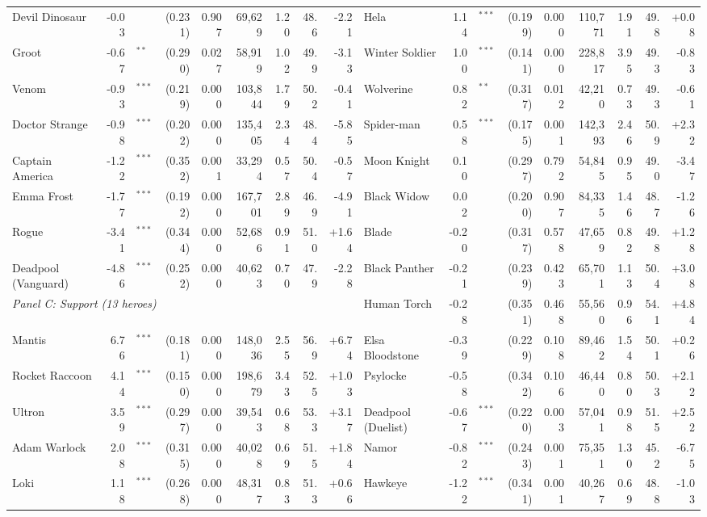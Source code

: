 \documentclass[11pt]{article}
\begin{document}
\begin{landscape}
\begin{center}
{\begin{tabular}{l r@{}l r r r r r r @{\hspace{1.5em}} l r@{}l r r r r r r}
Devil Dinosaur & -0.03 &  & (0.231) & 0.907 & 69,629 & 1.20 & 48.6 & -2.21 & Hela & 1.14 & $^{***}$ & (0.199) & 0.000 & 110,771 & 1.91 & 49.8 & +0.08 \\
Groot & -0.67 & $^{**}$ & (0.290) & 0.027 & 58,919 & 1.02 & 49.9 & -3.13 & Winter Soldier & 1.00 & $^{***}$ & (0.141) & 0.000 & 228,817 & 3.95 & 49.3 & -0.83 \\
Venom & -0.93 & $^{***}$ & (0.219) & 0.000 & 103,844 & 1.79 & 50.2 & -0.41 & Wolverine & 0.82 & $^{**}$ & (0.317) & 0.012 & 42,210 & 0.73 & 49.3 & -0.61 \\
Doctor Strange & -0.98 & $^{***}$ & (0.202) & 0.000 & 135,405 & 2.34 & 48.4 & -5.85 & Spider-man & 0.58 & $^{***}$ & (0.175) & 0.001 & 142,393 & 2.46 & 50.9 & +2.32 \\
Captain America & -1.22 & $^{***}$ & (0.352) & 0.001 & 33,294 & 0.57 & 50.4 & -0.57 & Moon Knight & 0.10 &  & (0.297) & 0.792 & 54,845 & 0.95 & 49.0 & -3.47 \\
Emma Frost & -1.77 & $^{***}$ & (0.192) & 0.000 & 167,701 & 2.89 & 46.9 & -4.91 & Black Widow & 0.02 &  & (0.200) & 0.907 & 84,335 & 1.46 & 48.7 & -1.26 \\
Rogue & -3.41 & $^{***}$ & (0.344) & 0.000 & 52,686 & 0.91 & 51.0 & +1.64 & Blade & -0.20 &  & (0.317) & 0.578 & 47,659 & 0.82 & 49.8 & +1.28 \\
Deadpool (Vanguard) & -4.86 & $^{***}$ & (0.252) & 0.000 & 40,623 & 0.70 & 47.9 & -2.28 & Black Panther & -0.21 &  & (0.239) & 0.423 & 65,701 & 1.13 & 50.4 & +3.08 \\
\multicolumn{9}{l}{\emph{Panel C: Support (13 heroes)}} & Human Torch & -0.28 &  & (0.351) & 0.468 & 55,560 & 0.96 & 54.1 & +4.84 \\
Mantis & 6.76 & $^{***}$ & (0.181) & 0.000 & 148,036 & 2.55 & 56.9 & +6.74 & Elsa Bloodstone & -0.39 &  & (0.229) & 0.108 & 89,462 & 1.54 & 50.1 & +0.26 \\
Rocket Raccoon & 4.14 & $^{***}$ & (0.150) & 0.000 & 198,679 & 3.43 & 52.5 & +1.03 & Psylocke & -0.58 &  & (0.342) & 0.106 & 46,440 & 0.80 & 50.3 & +2.12 \\
Ultron & 3.59 & $^{***}$ & (0.297) & 0.000 & 39,543 & 0.68 & 53.3 & +3.17 & Deadpool (Duelist) & -0.67 & $^{***}$ & (0.220) & 0.003 & 57,041 & 0.98 & 51.5 & +2.52 \\
Adam Warlock & 2.08 & $^{***}$ & (0.315) & 0.000 & 40,028 & 0.69 & 51.5 & +1.84 & Namor & -0.82 & $^{***}$ & (0.243) & 0.001 & 75,351 & 1.30 & 45.2 & -6.75 \\
Loki & 1.18 & $^{***}$ & (0.268) & 0.000 & 48,317 & 0.83 & 51.3 & +0.66 & Hawkeye & -1.22 & $^{***}$ & (0.341) & 0.001 & 40,267 & 0.69 & 48.8 & -1.03 \\

\end{tabular}}
\end{center}
\end{landscape}
\end{document}
